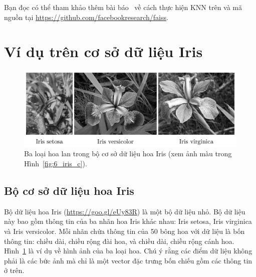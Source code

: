 Bạn đọc có thể tham khảo thêm bài báo~\cite{johnson2017billion} về cách thực
hiện KNN trên  và mã nguồn tại
\url{https://github.com/facebookresearch/faiss}.



\section{Ví dụ trên cơ sở dữ liệu Iris}

\begin{figure}[t]
\centering
\includegraphics[width = \textwidth]{Chapters/03_SimpleML/6_knn/iris_gray.png}
\caption[]{Ba loại hoa lan trong bộ cơ sở dữ liệu hoa Iris (xem ảnh màu trong Hình~\ref{fig:6_iris_c}).}
\label{fig:6_iris}
\end{figure}


\subsection{Bộ cơ sở dữ liệu hoa Iris}

Bộ dữ liệu hoa Iris (\url{https://goo.gl/eUy83R}) là một bộ dữ liệu nhỏ. Bộ dữ
liệu này bao gồm thông tin của ba nhãn hoa Iris khác nhau: Iris setosa, Iris
virginica và Iris versicolor. Mỗi nhãn chứa thông tin của 50 bông hoa với dữ
liệu là bốn thông tin: chiều dài, chiều rộng đài hoa, và chiều dài,
chiều rộng cánh hoa. Hình~\ref{fig:6_iris} là ví dụ về hình ảnh của ba
loại hoa. Chú ý rằng các điểm dữ liệu không phải là các bức ảnh mà chỉ là một
vector đặc trưng bốn chiếu gồm các thông tin ở trên.



